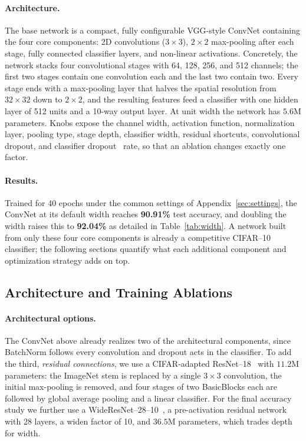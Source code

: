 \documentclass[11pt]{article}
\newcommand{\convAcc}{92.04}     %
\begin{document}
\paragraph{Architecture.} The base network is a compact, fully configurable
VGG-style ConvNet containing the four core components: 2D
convolutions ($3\times3$), $2\times2$ max-pooling after each
stage, fully connected classifier layers, and non-linear activations.
Concretely, the network stacks four convolutional stages with 64, 128, 256,
and 512 channels; the first two stages contain one convolution each and the
last two contain two. Every stage ends with a max-pooling layer that halves
the spatial resolution from $32\times32$ down to $2\times2$, and the resulting
features feed a classifier with one hidden layer of 512 units and a 10-way
output layer. At unit width the network has $5.6$M parameters. Knobs
expose the channel width, activation function, normalization layer, pooling
type, stage depth, classifier width, residual shortcuts, convolutional dropout,
and classifier dropout~\citep{srivastava2014dropout} rate, so that an
ablation changes exactly one factor.

\paragraph{Results.} Trained for 40 epochs under the common settings of
Appendix~\ref{sec:settings}, the ConvNet at its default width reaches
\textbf{90.91\%} test accuracy, and doubling the width raises this to
\textbf{\convAcc\%} as detailed in Table~\ref{tab:width}. A network built from
only these four core components is already a competitive CIFAR--10
classifier; the following sections quantify what each additional component and
optimization strategy adds on top.

\subsection{Architecture and Training Ablations}
\label{sec:optional}

\paragraph{Architectural options.} The ConvNet above already realizes two of the
architectural components, since BatchNorm follows every convolution
and dropout acts in the classifier. To add the third, \emph{residual
connections}, we use
a CIFAR-adapted ResNet--18~\citep{he2016deep} with $11.2$M parameters: the
ImageNet stem is replaced by a single $3\times3$ convolution, the initial
max-pooling is removed, and four stages of two BasicBlocks each are followed
by global average pooling and a linear classifier. For the final accuracy study
we further use a WideResNet--28--10~\citep{zagoruyko2016wide}, a pre-activation
residual network with 28 layers, a widen factor of 10, and $36.5$M parameters,
which trades depth for width.
\end{document}
